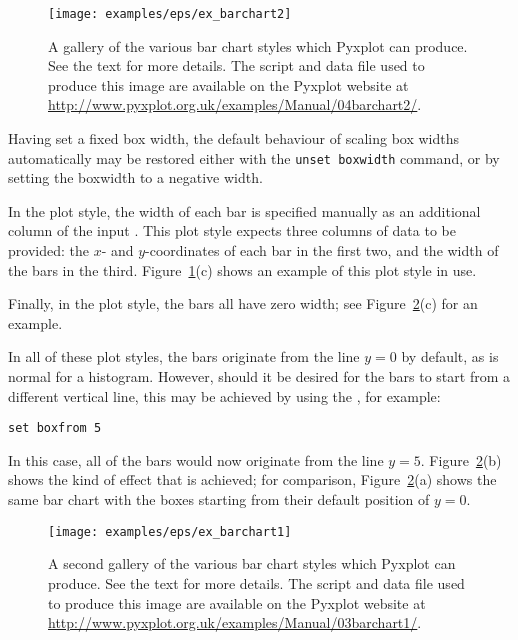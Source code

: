 \begin{figure}
\begin{center}
\texttt{[image: examples/eps/ex\_barchart2]}
\end{center}
\caption[A gallery of the various bar chart styles which Pyxplot can produce]
{A gallery of the various bar chart styles which Pyxplot can produce.
See the text for more details.  The script and data file used to produce this
image are available on the Pyxplot website at
\protect\url{http://www.pyxplot.org.uk/examples/Manual/04barchart2/}.}
\label{fig:ex_barchart2}
\end{figure}

Having set a fixed box width, the default behaviour of scaling box widths
automatically may be restored either with the {\tt unset boxwidth} command,
or by setting the boxwidth to a negative width.

In the  plot style, the width of each bar is specified manually
as an additional column of the input \datafile.  This plot style expects three
columns of data to be provided: the $x$- and $y$-coordinates of each bar in the
first two, and the width of the bars in the third.
Figure~\ref{fig:ex_barchart2}(c) shows an example of this plot style in use.

Finally, in the  plot style, the bars all have zero width; see
Figure~\ref{fig:ex_barchart1}(c) for an example.

In all of these plot styles, the bars originate from the line $y=0$ by default,
as is normal for a histogram. However, should it be desired for the bars to
start from a different vertical line, this may be achieved by using the
, for example:

\begin{verbatim}
set boxfrom 5
\end{verbatim}

\noindent In this case, all of the bars would now originate from the line
$y=5$. Figure~\ref{fig:ex_barchart1}(b) shows the kind of effect that is
achieved; for comparison, Figure~\ref{fig:ex_barchart1}(a) shows the same bar
chart with the boxes starting from their default position of $y=0$.

\begin{figure}
\begin{center}
\texttt{[image: examples/eps/ex\_barchart1]}
\end{center}
\caption[A second gallery of the various bar chart styles which Pyxplot can
produce]
{A second gallery of the various bar chart styles which Pyxplot can
produce. See the text for more details.  The script and data file used to
produce this image are available on the Pyxplot website at
\protect\url{http://www.pyxplot.org.uk/examples/Manual/03barchart1/}.}
\label{fig:ex_barchart1}
\end{figure}

